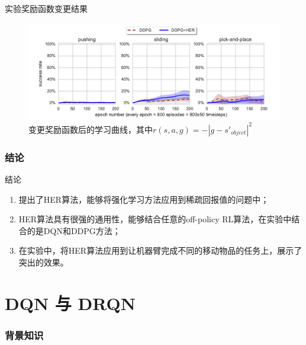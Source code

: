 \documentclass[10pt]{beamer}
\begin{document}
	\begin{frame}{实验}{奖励函数变更结果}
		\begin{figure}
			\centering
			\includegraphics[width=0.7\linewidth]{pictures/reward-shape-expr}
			\caption{变更奖励函数后的学习曲线，其中$r(s,a,g) = -|g-s'_{object}|^2$}
			\label{fig:reward-shape-expr}
		\end{figure}
		
	\end{frame}

	\section{结论}
	
	\begin{frame}{结论}
		\begin{enumerate}
			\item 提出了HER算法，能够将强化学习方法应用到稀疏回报值的问题中；
			\item HER算法具有很强的通用性，能够结合任意的off-policy RL算法，在实验中结合的是DQN和DDPG方法；
			\item 在实验中，将HER算法应用到让机器臂完成不同的移动物品的任务上，展示了突出的效果。
		\end{enumerate}
	\end{frame}
		

	\part{DQN 与 DRQN}
	
	\section{背景知识}
	
\end{document}
